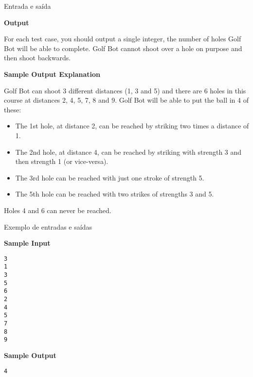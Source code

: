 \begin{frame}[fragile]{Entrada e saída}

\textbf{Output}

For each test case, you should output a single integer, the number of holes Golf Bot will be able
to complete. Golf Bot cannot shoot over a hole on purpose and then shoot backwards.

\textbf{Sample Output Explanation}

Golf Bot can shoot 3 different distances (1, 3 and 5) and there are 6 holes in this course at
distances 2, 4, 5, 7, 8 and 9. Golf Bot will be able to put the ball in 4 of these:
\begin{itemize}
    \item The 1st hole, at distance 2, can be reached by striking two times a distance of 1.
    \item The 2nd hole, at distance 4, can be reached by striking with strength 3 and then strength 1 (or
vice-versa).
    \item The 3rd hole can be reached with just one stroke of strength 5.
    \item The 5th hole can be reached with two strikes of strengths 3 and 5.
\end{itemize}

Holes 4 and 6 can never be reached.
\end{frame}

\begin{frame}[fragile]{Exemplo de entradas e saídas}

\begin{minipage}[t]{0.45\textwidth}
\textbf{Sample Input}
\begin{verbatim}
3
1
3
5
6
2
4
5
7
8
9
\end{verbatim}
\end{minipage}
\begin{minipage}[t]{0.5\textwidth}
\textbf{Sample Output}
\begin{verbatim}
4
\end{verbatim}
\end{minipage}
\end{frame}

